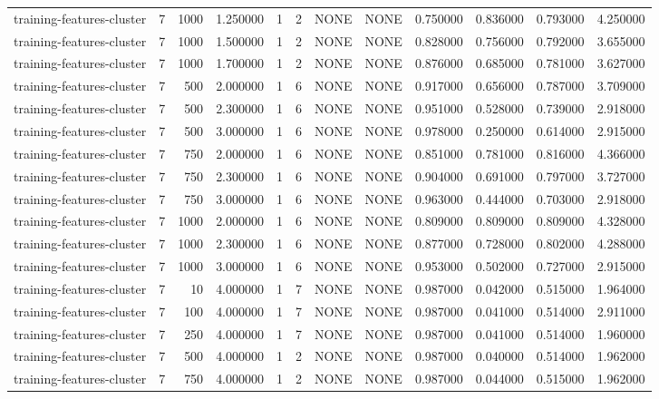 \begin{tabular}{lrrrllllrrrr}
training-features-cluster & 7 & 1000 & 1.250000 & 1 & 2 & NONE & NONE & 0.750000 & 0.836000 & 0.793000 & 4.250000 \\
training-features-cluster & 7 & 1000 & 1.500000 & 1 & 2 & NONE & NONE & 0.828000 & 0.756000 & 0.792000 & 3.655000 \\
training-features-cluster & 7 & 1000 & 1.700000 & 1 & 2 & NONE & NONE & 0.876000 & 0.685000 & 0.781000 & 3.627000 \\
training-features-cluster & 7 & 500 & 2.000000 & 1 & 6 & NONE & NONE & 0.917000 & 0.656000 & 0.787000 & 3.709000 \\
training-features-cluster & 7 & 500 & 2.300000 & 1 & 6 & NONE & NONE & 0.951000 & 0.528000 & 0.739000 & 2.918000 \\
training-features-cluster & 7 & 500 & 3.000000 & 1 & 6 & NONE & NONE & 0.978000 & 0.250000 & 0.614000 & 2.915000 \\
training-features-cluster & 7 & 750 & 2.000000 & 1 & 6 & NONE & NONE & 0.851000 & 0.781000 & 0.816000 & 4.366000 \\
training-features-cluster & 7 & 750 & 2.300000 & 1 & 6 & NONE & NONE & 0.904000 & 0.691000 & 0.797000 & 3.727000 \\
training-features-cluster & 7 & 750 & 3.000000 & 1 & 6 & NONE & NONE & 0.963000 & 0.444000 & 0.703000 & 2.918000 \\
training-features-cluster & 7 & 1000 & 2.000000 & 1 & 6 & NONE & NONE & 0.809000 & 0.809000 & 0.809000 & 4.328000 \\
training-features-cluster & 7 & 1000 & 2.300000 & 1 & 6 & NONE & NONE & 0.877000 & 0.728000 & 0.802000 & 4.288000 \\
training-features-cluster & 7 & 1000 & 3.000000 & 1 & 6 & NONE & NONE & 0.953000 & 0.502000 & 0.727000 & 2.915000 \\
training-features-cluster & 7 & 10 & 4.000000 & 1 & 7 & NONE & NONE & 0.987000 & 0.042000 & 0.515000 & 1.964000 \\
training-features-cluster & 7 & 100 & 4.000000 & 1 & 7 & NONE & NONE & 0.987000 & 0.041000 & 0.514000 & 2.911000 \\
training-features-cluster & 7 & 250 & 4.000000 & 1 & 7 & NONE & NONE & 0.987000 & 0.041000 & 0.514000 & 1.960000 \\
training-features-cluster & 7 & 500 & 4.000000 & 1 & 2 & NONE & NONE & 0.987000 & 0.040000 & 0.514000 & 1.962000 \\
training-features-cluster & 7 & 750 & 4.000000 & 1 & 2 & NONE & NONE & 0.987000 & 0.044000 & 0.515000 & 1.962000 \\

\end{tabular}

